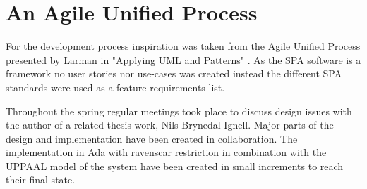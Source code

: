 \section{An Agile Unified Process}
For the development process inspiration was taken from the Agile Unified
Process presented by Larman in "Applying UML and Patterns" \cite{larman2005}.
As the SPA software is a framework no user stories nor use-cases was created
instead the different SPA standards were used as a feature requirements list.

Throughout the spring regular meetings took place to discuss design issues
with the author of a related thesis work, Nils Brynedal Ignell. Major parts of
the design and implementation have been created in collaboration. The
implementation in Ada with ravenscar restriction in combination with the UPPAAL
model of the system have been created in small increments to reach their final
state.
